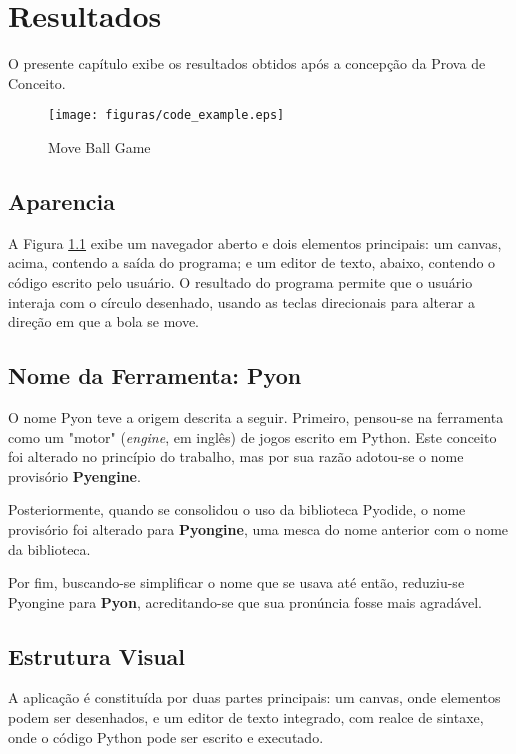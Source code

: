 \chapter[Resultados]{Resultados}

O presente capítulo exibe os resultados obtidos após a concepção da Prova de Conceito.

\begin{figure}[!ht]
    \centering
    \caption{Move Ball Game}
    \texttt{[image: figuras/code\_example.eps]}
    \label{fig:code}
\end{figure}

\section{Aparencia}

A Figura \ref{fig:code} exibe um navegador aberto e dois elementos principais: um canvas, acima, contendo a saída do programa; e um editor de texto, abaixo, contendo o código escrito pelo usuário. O resultado do programa permite que o usuário interaja com o círculo desenhado, usando as teclas direcionais para alterar a direção em que a bola se move. 

\section{Nome da Ferramenta: Pyon}

O nome Pyon teve a origem descrita a seguir. Primeiro, pensou-se na ferramenta como um "motor" 
(\textit{engine}, em inglês) de jogos escrito em Python. Este conceito foi alterado no princípio do trabalho, mas por sua razão adotou-se o nome provisório \textbf{Pyengine}.

Posteriormente, quando se consolidou o uso da biblioteca Pyodide, o nome provisório foi alterado para
\textbf{Pyongine}, uma mesca do nome anterior com o nome da biblioteca.

Por fim, buscando-se simplificar o nome que se usava até então, reduziu-se Pyongine para \textbf{Pyon},
acreditando-se que sua pronúncia fosse mais agradável.

\section{Estrutura Visual}

A aplicação é constituída por duas partes principais: um canvas, onde elementos podem ser desenhados, e um editor de texto integrado, com realce de sintaxe, onde o código Python pode ser escrito e executado.


